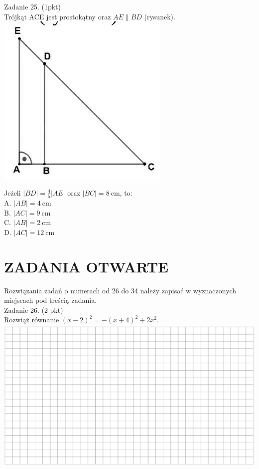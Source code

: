 \documentclass[10pt]{article}
\begin{document}
Zadanie 25. (1pkt)\\
Trójkąt ACE jest prostokątny oraz \(A E \| B D\) (rysunek).\\
\includegraphics[max width=\textwidth, center]{2024_11_21_a68a2ba4fc31c5fb438eg-06(2)}

Jeżeli \(|B D|=\frac{4}{5}|A E|\) oraz \(|B C|=8 \mathrm{~cm}\), to:\\
A. \(|A B|=4 \mathrm{~cm}\)\\
B. \(|A C|=9 \mathrm{~cm}\)\\
C. \(|A B|=2 \mathrm{~cm}\)\\
D. \(|A C|=12 \mathrm{~cm}\)

\section*{ZADANIA OTWARTE}
Rozwiązania zadań o numerach od 26 do 34 należy zapisać w wyznaczonych miejscach pod treścią zadania.\\
Zadanie 26. (2 pkt)\\
Rozwiąż równanie \((x-2)^{2}=-(x+4)^{2}+2 x^{2}\).\\
\includegraphics[max width=\textwidth, center]{2024_11_21_a68a2ba4fc31c5fb438eg-08}
\end{document}
